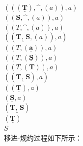 \documentclass{article}
\begin{document}
$(((\underline{\textbf{T}}),\^{},(a)),a)$\\
$((\underline{\textbf{S}},\^{},(a)),a)$\\
$((T,\^{},(a)),a)$\\
$((\underline{\textbf{T, S}},(a)),a)$\\
$((T,(\underline{\textbf{a}})),a)$\\
$((T,(\underline{\textbf{S}})),a)$\\
$((T,(\underline{\textbf{T}})),a)$\\
$((\underline{\textbf{T, S}}),a)$\\
$((\underline{\textbf{T}}),a)$\\
$(\underline{\textbf{S}},a)$\\
$(\underline{\textbf{T, S}})$\\
$(\underline{\textbf{T}})$\\
$S$\\
移进-规约过程如下所示：
\end{document}
